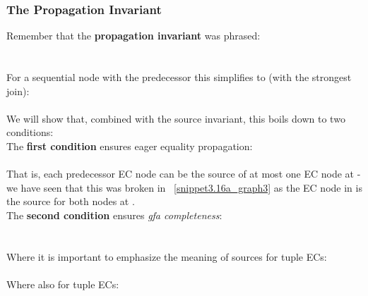 \subsubsection*{The Propagation Invariant}
Remember that the \textbf{propagation invariant} was phrased:\\
 \\
\\
For a sequential node  with the predecessor  this simplifies to (with the strongest join):\\
\\
We will show that, combined with the source invariant, this boils down to two conditions:\\
The \textbf{first condition} ensures eager equality propagation:\\
\\
That is, each predecessor EC node can be the source of at most one EC node at - 
we have seen that this was broken in ~\ref{snippet3.16a_graph3} as the EC node  in  
is the source for both nodes  at .\\ 
The \textbf{second condition} ensures \emph{gfa completeness}:\\
\\
\\
Where it is important to emphasize the meaning of sources for tuple ECs:\\
\\
Where also for tuple ECs:\\

